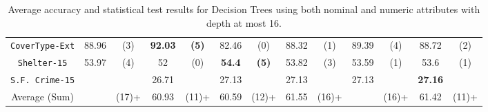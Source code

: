 \begin{table}
\begin{tabular}{c|cc|cc|cc|cc|cc|cc}
{\tt CoverType-Ext}  &  88.96         &  (3)              &  {\bf 92.03}&  {\bf (5)}    &  82.46       &  (0)               &  88.32      & (1)            & 89.39        & (4)       & 88.72        & (2)       \\
{\tt Shelter-15}     &  53.97         &  (4)              &  52         &  (0)          &  {\bf 54.4}  &  {\bf (5)}         &  53.82      & (3)            & 53.59        & (1)       & 53.6         & (1)       \\   
{\tt S.F. Crime-15}  &                &                   &  26.71      &               &  27.13       &                    &  27.13      &                & 27.13        &           & {\bf 27.16}  &           \\
\hline
Average (Sum)        &                &  (17)+            & 60.93       &  (11)+        &   60.59      &  (12)+             &  61.55      & (16)+          &              & (16)+     & 61.42        & (11)+

\end{tabular}
\caption{Average accuracy and statistical test results for  Decision Trees using both nominal and numeric attributes with depth at most 16.}
\label{exp:numeric-16}
\normalsize
\end{table}

